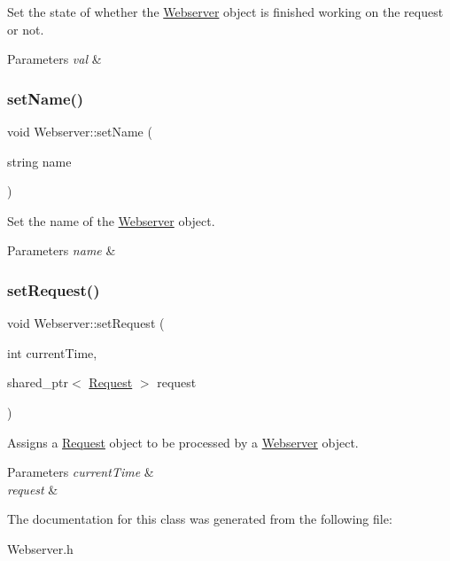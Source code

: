 Set the state of whether the \hyperlink{classWebserver}{Webserver} object is finished working on the request or not. 


\begin{DoxyParams}{Parameters}
{\em val} & \\
\hline
\end{DoxyParams}
\mbox{\label{classWebserver_aa4a2355e2a69cd811173efe85b158525}} 
\subsubsection{\texorpdfstring{set\+Name()}{setName()}}
{\footnotesize\ttfamily void Webserver\+::set\+Name (\begin{DoxyParamCaption}\item[{string}]{name }\end{DoxyParamCaption})\hspace{0.3cm}{\ttfamily [inline]}}



Set the name of the \hyperlink{classWebserver}{Webserver} object. 


\begin{DoxyParams}{Parameters}
{\em name} & \\
\hline
\end{DoxyParams}
\mbox{\label{classWebserver_af579724e554c818287932988c0de111e}} 
\subsubsection{\texorpdfstring{set\+Request()}{setRequest()}}
{\footnotesize\ttfamily void Webserver\+::set\+Request (\begin{DoxyParamCaption}\item[{int}]{current\+Time,  }\item[{shared\+\_\+ptr$<$ \hyperlink{classRequest}{Request} $>$}]{request }\end{DoxyParamCaption})\hspace{0.3cm}{\ttfamily [inline]}}



Assigns a \hyperlink{classRequest}{Request} object to be processed by a \hyperlink{classWebserver}{Webserver} object. 


\begin{DoxyParams}{Parameters}
{\em current\+Time} & \\
\hline
{\em request} & \\
\hline
\end{DoxyParams}


The documentation for this class was generated from the following file\+:\begin{DoxyCompactItemize}
\item 
Webserver.\+h\end{DoxyCompactItemize}
